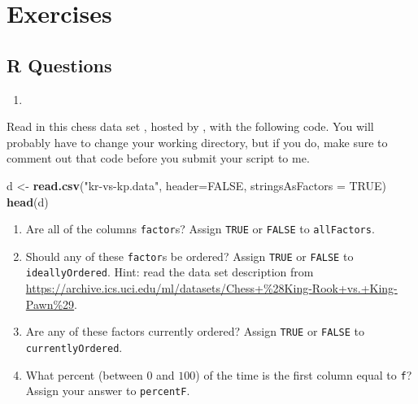 \documentclass[12pt,krantz2]{krantz}
\makeatletter
\newenvironment{Shaded}{\begin{snugshade}}{\end{snugshade}}
\newcommand{\DataTypeTok}[1]{\textcolor[rgb]{0.27,0.27,0.27}{#1}}
\newcommand{\KeywordTok}[1]{\textcolor[rgb]{0.27,0.27,0.27}{\textbf{#1}}}
\newcommand{\NormalTok}[1]{#1}
\newcommand{\OtherTok}[1]{\textcolor[rgb]{0.37,0.37,0.37}{#1}}
\newcommand{\StringTok}[1]{\textcolor[rgb]{0.5,0.5,0.5}{#1}}
\providecommand{\tightlist}{%
  \setlength{\itemsep}{0pt}\setlength{\parskip}{0pt}}
\newenvironment{kframe}{%
\medskip{}
\setlength{\fboxsep}{.8em}
 \def\at@end@of@kframe{}%
 \ifinner\ifhmode%
  \def\at@end@of@kframe{\end{minipage}}%
  \begin{minipage}{\columnwidth}%
 \fi\fi%
 \def\FrameCommand##1{\hskip\@totalleftmargin \hskip-\fboxsep
 \colorbox{shadecolor}{##1}\hskip-\fboxsep
     \hskip-\linewidth \hskip-\@totalleftmargin \hskip\columnwidth}%
 \MakeFramed {\advance\hsize-\width
   \@totalleftmargin\z@ \linewidth\hsize
   \@setminipage}}%
 {\par\unskip\endMakeFramed%
 \at@end@of@kframe}
\renewenvironment{Shaded}{\begin{kframe}}{\end{kframe}}
\makeatother
\begin{document}
\hypertarget{exercises-5}{%
\section{Exercises}\label{exercises-5}}

\hypertarget{r-questions-5}{%
\subsection{R Questions}\label{r-questions-5}}

\begin{enumerate}
\def\labelenumi{\arabic{enumi}.}
\item
\end{enumerate}

Read in this chess data set \citep{misc_chess}, hosted by \citep{uci_data}, with the following code. You will probably have to change your working directory, but if you do, make sure to comment out that code before you submit your script to me.

\begin{Shaded}
\begin{Highlighting}[]
\NormalTok{d <-}\StringTok{ }\KeywordTok{read.csv}\NormalTok{(}\StringTok{"kr-vs-kp.data"}\NormalTok{, }\DataTypeTok{header=}\OtherTok{FALSE}\NormalTok{, }\DataTypeTok{stringsAsFactors =} \OtherTok{TRUE}\NormalTok{)}
\KeywordTok{head}\NormalTok{(d)}
\end{Highlighting}
\end{Shaded}

\begin{enumerate}
\def\labelenumi{\alph{enumi})}
\tightlist
\item
  Are all of the columns \texttt{factor}s? Assign \texttt{TRUE} or \texttt{FALSE} to \texttt{allFactors}.
\item
  Should any of these \texttt{factor}s be ordered? Assign \texttt{TRUE} or \texttt{FALSE} to \texttt{ideallyOrdered}. Hint: read the data set description from \url{https://archive.ics.uci.edu/ml/datasets/Chess+\%28King-Rook+vs.+King-Pawn\%29}.
\item
  Are any of these factors currently ordered? Assign \texttt{TRUE} or \texttt{FALSE} to \texttt{currentlyOrdered}.
\item
  What percent (between \(0\) and \(100\)) of the time is the first column equal to \texttt{\textquotesingle{}f\textquotesingle{}}? Assign your answer to \texttt{percentF}.
\end{enumerate}
\end{document}
